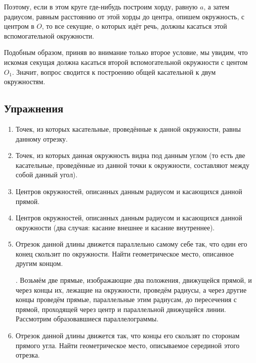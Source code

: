 Поэтому, если в этом круге где-нибудь построим хорду, равную $a$, а затем радиусом, равным расстоянию от этой хорды до центра, опишем окружность, с центром в $O$, то все секущие, о которых идёт речь, должны касаться этой вспомогательной окружности.

Подобным образом, приняв во внимание только второе условие, мы увидим, что искомая секущая должна касаться второй вспомогательной окружности с центом $O_1$.
Значит, вопрос сводится к построению общей касательной к двум окружностям.

\subsection*{Упражнения}

\begin{center}
\end{center}

\begin{enumerate}

\item
Точек, из которых касательные, проведённые к данной окружности, равны данному отрезку.
 
\item

Точек, из которых данная окружность видна под данным углом (то есть две касательные, проведённые из данной точки к окружности, составляют между собой данный угол).



\item
Центров окружностей, описанных данным радиусом и касающихся данной прямой.

\item
Центров окружностей, описанных данным радиусом и касающихся данной окружности (два случая:
касание внешнее и касание внутреннее).

\item
Отрезок данной длины движется параллельно самому себе так, что один его конец скользит по окружности.
Найти геометрическое место, описанное другим концом.

\smallskip
{}.
Возьмём две прямые, изображающие два положения, движущейся прямой, и через концы их, лежащие на окружности, проведём радиусы, а через другие концы проведём прямые, параллельные этим радиусам, до пересечения с прямой, проходящей через центр и параллельной движущейся линии.
Рассмотрим образовавшиеся параллелограммы.

\item
Отрезок данной длины движется так, что концы его скользят по сторонам прямого угла.
Найти геометрическое место, описываемое серединой этого отрезка.

\end{enumerate}

